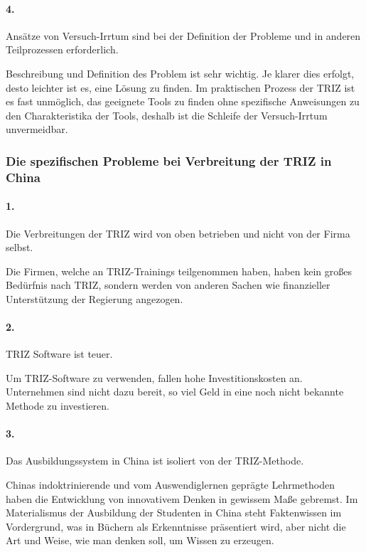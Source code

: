 \documentclass[11pt,a4paper]{article}
\begin{document}
\paragraph{4.}
Ansätze von Versuch-Irrtum sind bei der Definition der Probleme und in anderen
Teilprozessen erforderlich.

Beschreibung und Definition des Problem ist sehr wichtig. Je klarer dies
erfolgt, desto leichter ist es, eine Lösung zu finden. Im praktischen Prozess
der TRIZ ist es fast unmöglich, das geeignete Tools zu finden ohne spezifische
Anweisungen zu den Charakteristika der Tools, deshalb ist die Schleife der
Versuch-Irrtum unvermeidbar.

\subsubsection{Die spezifischen Probleme bei Verbreitung der TRIZ in China}

\paragraph{1.}
Die Verbreitungen der TRIZ wird von oben betrieben und nicht von der Firma
selbst.

Die Firmen, welche an TRIZ-Trainings teilgenommen haben, haben kein großes
Bedürfnis nach TRIZ, sondern werden von anderen Sachen wie finanzieller
Unterstützung der Regierung angezogen.

\paragraph{2.}
TRIZ Software ist teuer.

Um TRIZ-Software zu verwenden, fallen hohe Investitionskosten an.  Unternehmen
sind nicht dazu bereit, so viel Geld in eine noch nicht bekannte Methode zu
investieren.

\paragraph{3.}
Das Ausbildungssystem in China ist isoliert von der TRIZ-Methode.

Chinas indoktrinierende und vom Auswendiglernen geprägte Lehrmethoden haben
die Entwicklung von innovativem Denken in gewissem Maße gebremst. Im
Materialismus der Ausbildung der Studenten in China steht Faktenwissen im
Vordergrund, was in Büchern als Erkenntnisse präsentiert wird, aber nicht die
Art und Weise, wie man denken soll, um Wissen zu erzeugen.
\end{document}
